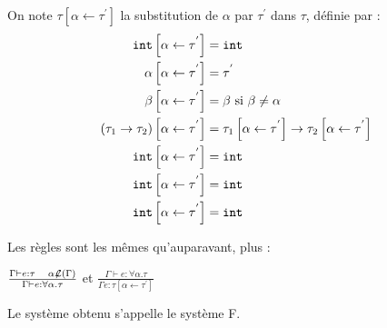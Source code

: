 \documentclass{cours}
\begin{document}
\begin{definition}
    On note $\tau\left[\alpha \leftarrow \tau^{'}\right]$ la substitution de $\alpha$ par $\tau^{'}$ dans $\tau$, définie par :
    \[
        \begin{aligned}
            \texttt{int}\left[\alpha \leftarrow \tau^{'}\right]                                      & = \texttt{int}                                                                                                       \\
            \alpha\left[\alpha \leftarrow \tau^{'}\right]                                     & = \tau^{'}                                                                                                    \\
            \beta\left[\alpha \leftarrow \tau^{'}\right]                                      & = \beta \text{ si } \beta \neq \alpha                                                                         \\
            \left(\tau_{1} \rightarrow \tau_{2}\right)\left[\alpha \leftarrow \tau^{'}\right] & = \tau_{1}\left[\alpha \leftarrow \tau^{'}\right] \rightarrow \tau_{2}\left[\alpha \leftarrow \tau^{'}\right] \\
            \texttt{int}\left[\alpha \leftarrow \tau^{'}\right]                                      & = \texttt{int}                                                                                                       \\
            \texttt{int}\left[\alpha \leftarrow \tau^{'}\right]                                      & = \texttt{int}                                                                                                       \\
            \texttt{int}\left[\alpha \leftarrow \tau^{'}\right]                                      & = \texttt{int}                                                                                                       \\
        \end{aligned}
    \]
\end{definition}

Les règles sont les mêmes qu'auparavant, plus :
\begin{center}
    $\frac{\Gamma \vdash e : \tau \ \ \ \alpha \not \mathcal{L}(\Gamma)}{\Gamma \vdash e : \forall\alpha.\tau}$ et
    $\frac{\Gamma \vdash e : \forall\alpha.\tau}{\Gamma e : \tau\left[\alpha \leftarrow \tau^{'}\right]}$
\end{center}
Le système obtenu s'appelle le système F.
\end{document}
